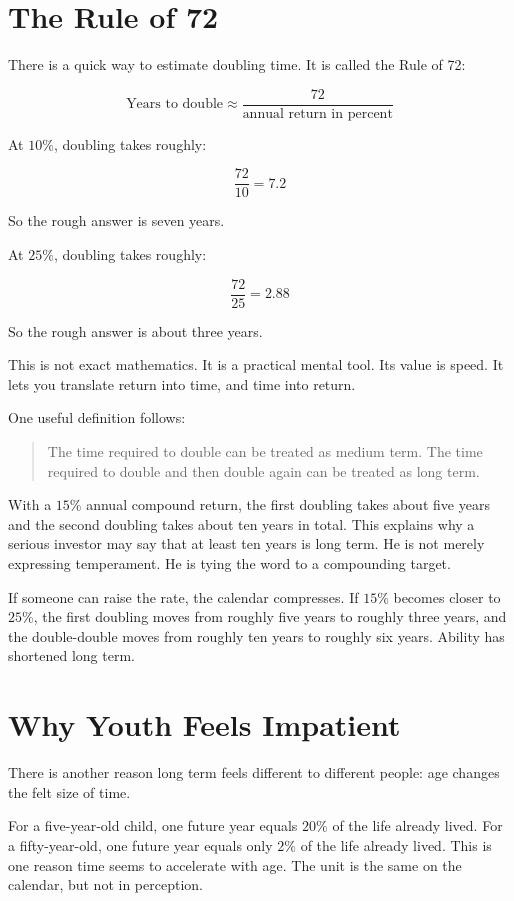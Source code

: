 \section*{The Rule of 72}

There is a quick way to estimate doubling time. It is called the Rule of 72:

\[
\text{Years to double}\approx \frac{72}{\text{annual return in percent}}
\]

At \(10\%\), doubling takes roughly:

\[
\frac{72}{10}=7.2
\]

So the rough answer is seven years.

At \(25\%\), doubling takes roughly:

\[
\frac{72}{25}=2.88
\]

So the rough answer is about three years.

This is not exact mathematics. It is a practical mental tool. Its value is speed. It lets you translate return into time, and time into return.

One useful definition follows:

\begin{quote}
The time required to double can be treated as medium term. The time required to double and then double again can be treated as long term.
\end{quote}

With a \(15\%\) annual compound return, the first doubling takes about five years and the second doubling takes about ten years in total. This explains why a serious investor may say that at least ten years is long term. He is not merely expressing temperament. He is tying the word to a compounding target.

If someone can raise the rate, the calendar compresses. If \(15\%\) becomes closer to \(25\%\), the first doubling moves from roughly five years to roughly three years, and the double-double moves from roughly ten years to roughly six years. Ability has shortened long term.

\section*{Why Youth Feels Impatient}

There is another reason long term feels different to different people: age changes the felt size of time.

For a five-year-old child, one future year equals \(20\%\) of the life already lived. For a fifty-year-old, one future year equals only \(2\%\) of the life already lived. This is one reason time seems to accelerate with age. The unit is the same on the calendar, but not in perception.

